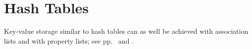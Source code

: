 %
%

\section{Hash Tables} 
Key-value storage similar to hash tables can as well be achieved with
association lists and with property lists; see
pp.\ \pageref{section:Association Lists} and
\pageref{:property_lists}. 


